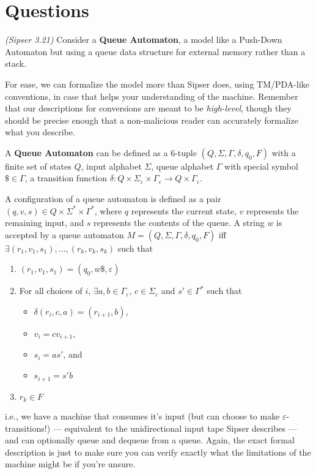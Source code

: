 \documentclass{exam}
\theoremstyle{definition}
\begin{document}
\section*{Questions}
\begin{questions}
    \question *\textit{(Sipser 3.21)} Consider a \textbf{Queue Automaton}, a model like a Push-Down Automaton but using a queue data structure for external memory rather than a stack.  

    For ease, we can formalize the model more than Sipser does, using TM/PDA-like conventions, in case that helps your understanding of the machine. Remember that our descriptions for conversions are meant to be \textit{high-level}, though they should be precise enough that a non-malicious reader can accurately formalize what you describe.
    
    A \textbf{Queue Automaton} can be defined as a 6-tuple $(Q, \Sigma, \Gamma, \delta, q_0, F)$ with a finite set of states $Q$, input alphabet $\Sigma$, queue alphabet $\Gamma$ with special symbol $\$\in \Gamma$, a transition function $\delta: Q \times \Sigma_{\varepsilon} \times \Gamma_{\varepsilon} \to Q \times \Gamma_{\varepsilon}$.

    A configuration of a queue automaton is defined as a pair $(q, v,  s) \in Q \times \Sigma^* \times \Gamma^*$, where $q$ represents the current state, $v$ represents the remaining input, and $s$ represents the contents of the queue. A string $w$ is accepted by a queue automaton $M = (Q, \Sigma, \Gamma, \delta, q_0, F)$ iff $\exists (r_1, v_1, s_1), \dots, (r_k, v_k, s_k)$ such that 
    \begin{enumerate}
        \item $(r_1, v_1, s_1) = (q_0, w\$, \varepsilon)$
        \item For all choices of $i$, $\exists a,b \in \Gamma_\varepsilon$, $c \in \Sigma_\varepsilon$ and $s' \in \Gamma^*$ such that 
        \begin{itemize}
            \item $\delta(r_i, c, a) = (r_{i+1}, b)$, 
            \item $v_{i} = cv_{i+1}$,
            \item $s_i = as'$, and
            \item $s_{i+1} = s'b$
        \end{itemize}
        \item $r_k \in F$
    \end{enumerate}
    i.e., we have a machine that consumes it's input (but can choose to make $\varepsilon$-transitions!) --- equivalent to the unidirectional input tape Sipser describes --- and can optionally queue and dequeue from a queue. Again, the exact formal description is just to make sure you can verify exactly what the limitations of the machine might be if you're unsure.


\end{questions}
\end{document}
